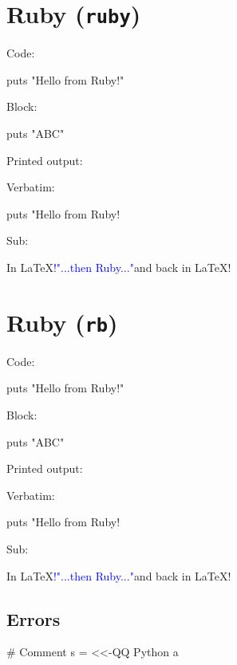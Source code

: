 \documentclass[11pt]{article}
\begin{document}
\section*{Ruby (\texttt{ruby})}


Code:
\begin{rubycode}
puts "Hello from Ruby!"
\end{rubycode}

Block:
\begin{rubyblock}
puts "ABC"
\end{rubyblock}
Printed output:  \printpythontex

Verbatim:
\begin{rubyverbatim}
puts "Hello from Ruby!
\end{rubyverbatim}

Sub:
\begin{rubysub}
In \LaTeX\textcolor{blue}{!{"...then Ruby..."}}and back in \LaTeX!
\end{rubysub}



\section*{Ruby (\texttt{rb})}


Code:
\begin{rbcode}
puts "Hello from Ruby!"
\end{rbcode}

Block:
\begin{rbblock}
puts "ABC"
\end{rbblock}
Printed output:  \printpythontex

Verbatim:
\begin{rbverbatim}
puts "Hello from Ruby!
\end{rbverbatim}

Sub:
\begin{rbsub}
In \LaTeX\textcolor{blue}{!{"...then Ruby..."}}and back in \LaTeX!
\end{rbsub}



\subsection*{Errors}


\begin{rubyblock}[err1]
# Comment
s = <<-QQ Python a
\end{rubyblock}
\end{document}
